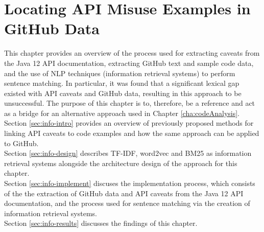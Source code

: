 \chapter{Locating API Misuse Examples in GitHub Data}
\label{cha:infoRetrieval}
This chapter provides an overview of the process used for extracting caveats from the Java 12 API documentation, extracting GitHub text and sample code data, and the use of NLP techniques (information retrieval systems) to perform sentence matching.  In particular, it was found that a significant lexical gap existed with API caveats and GitHub data, resulting in this approach to be unsuccessful. The purpose of this chapter is to, therefore, be a reference and act as a bridge for an alternative approach used in Chapter \ref{cha:codeAnalysis}. \\

\noindent
Section \ref{sec:info-intro} provides an overview of previously proposed methods for linking API caveats to code examples and how the same approach can be applied to GitHub. \\

\noindent
Section \ref{sec:info-design} describes TF-IDF, word2vec and BM25 as information retrieval systems alongside the architecture design of the approach for this chapter.\\

Section \ref{sec:info-implement} discuses the implementation process, which consists of the 
the extraction of GitHub data and API caveats from the Java 12 API documentation, and the process used for sentence matching via the creation of information retrieval systems. \\

\noindent
Section \ref{sec:info-results} discusses the findings of this chapter. \\

